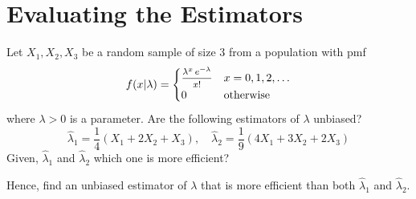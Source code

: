 \section{Evaluating the Estimators}

\begin{example}
    Let $X_1, X_2, X_3$ be a random sample of size 3 from a population with pmf 
    \[
        f(x|\lambda) = \begin{cases}
            \mfrac{\lambda^x\, e^{-\lambda}}{x!} & x = 0, 1, 2, \ldots\\
            0 & \text{otherwise}
        \end{cases}
    \]
    where $\lambda > 0$ is a parameter. Are the following estimators of $\lambda$ unbiased?
    \[
        \hat{\lambda}_1 = \frac{1}{4}(X_1 + 2X_2 + X_3), \quad \hat{\lambda}_2 = \frac{1}{9}(4X_1 + 3X_2 + 2X_3) 
    \]
    Given, $\hat{\lambda}_1$ and $\hat{\lambda}_2$ which one is more efficient? 
    
    Hence, find an unbiased estimator of $\lambda$ that is more efficient than both $\hat{\lambda}_1$ and $\hat{\lambda}_2$.
\end{example}
